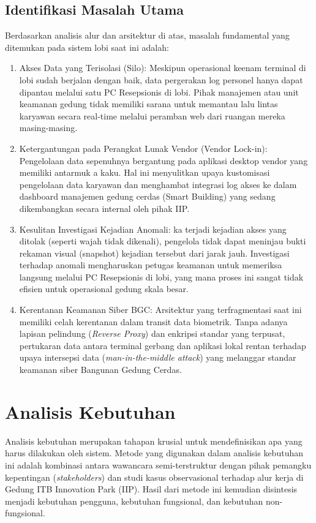 \subsection{Identifikasi Masalah Utama}
Berdasarkan analisis alur dan arsitektur di atas, masalah fundamental yang ditemukan pada sistem lobi saat ini adalah:
\begin{enumerate}
    \item Akses Data yang Terisolasi (Silo): Meskipun operasional keenam terminal di lobi sudah berjalan dengan baik, data pergerakan log personel hanya dapat dipantau melalui satu PC Resepsionis di lobi. Pihak manajemen atau unit keamanan gedung tidak memiliki sarana untuk memantau lalu lintas karyawan secara real-time melalui peramban web dari ruangan mereka masing-masing.
    \item Ketergantungan pada Perangkat Lunak Vendor (Vendor Lock-in): Pengelolaan data sepenuhnya bergantung pada aplikasi desktop vendor yang memiliki antarmuk   a kaku. Hal ini menyulitkan upaya kustomisasi pengelolaan data karyawan dan menghambat integrasi log akses ke dalam dashboard manajemen gedung cerdas (Smart Building) yang sedang dikembangkan secara internal oleh pihak IIP.
    \item Kesulitan Investigasi Kejadian Anomali:   ka terjadi kejadian akses yang ditolak (seperti wajah tidak dikenali), pengelola tidak dapat meninjau bukti rekaman visual (snapshot) kejadian tersebut dari jarak jauh. Investigasi terhadap anomali mengharuskan petugas keamanan untuk memeriksa langsung melalui PC Resepsionis di lobi, yang mana proses ini sangat tidak efisien untuk operasional gedung skala besar.
    \item Kerentanan Keamanan Siber BGC: Arsitektur yang terfragmentasi saat ini memiliki celah kerentanan dalam transit data biometrik. Tanpa adanya lapisan pelindung (\textit{Reverse Proxy}) dan enkripsi standar yang terpusat, pertukaran data antara terminal gerbang dan aplikasi lokal rentan terhadap upaya intersepsi data (\textit{man-in-the-middle attack}) yang melanggar standar keamanan siber Bangunan Gedung Cerdas.
\end{enumerate}

\section{Analisis Kebutuhan}
Analisis kebutuhan merupakan tahapan krusial untuk mendefinisikan apa yang harus dilakukan oleh sistem. Metode yang digunakan dalam analisis kebutuhan ini adalah kombinasi antara wawancara semi-terstruktur dengan pihak pemangku kepentingan (\textit{stakeholders}) dan studi kasus observasional terhadap alur kerja di Gedung ITB Innovation Park (IIP). Hasil dari metode ini kemudian disintesis menjadi kebutuhan pengguna, kebutuhan fungsional, dan kebutuhan non-fungsional.

